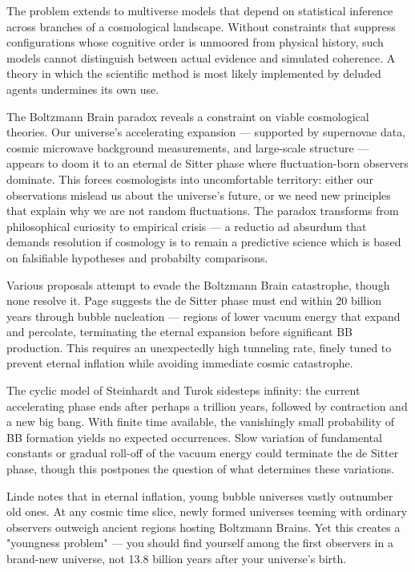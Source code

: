 The problem extends to multiverse models that depend on statistical inference across branches of a cosmological landscape. Without constraints that suppress configurations whose cognitive order is unmoored from physical history, such models cannot distinguish between actual evidence and simulated coherence. A theory in which the scientific method is most likely implemented by deluded agents undermines its own use.

The Boltzmann Brain paradox reveals a constraint on viable cosmological theories. Our universe's accelerating expansion — supported by supernovae data, cosmic microwave background measurements, and large-scale structure — appears to doom it to an eternal de Sitter phase where fluctuation-born observers dominate. This forces cosmologists into uncomfortable territory: either our observations mislead us about the universe's future, or we need new principles that explain why we are not random fluctuations. The paradox transforms from philosophical curiosity to empirical crisis — a reductio ad absurdum that demands resolution if cosmology is to remain a predictive science which is based on falsifiable hypotheses and probabilty comparisons.

Various proposals attempt to evade the Boltzmann Brain catastrophe, though none resolve it. Page suggests the de Sitter phase must end within 20 billion years through bubble nucleation — regions of lower vacuum energy that expand and percolate, terminating the eternal expansion before significant BB production. This requires an unexpectedly high tunneling rate, finely tuned to prevent eternal inflation while avoiding immediate cosmic catastrophe.

The cyclic model of Steinhardt and Turok sidesteps infinity: the current accelerating phase ends after perhaps a trillion years, followed by contraction and a new big bang. With finite time available, the vanishingly small probability of BB formation yields no expected occurrences. Slow variation of fundamental constants or gradual roll-off of the vacuum energy could terminate the de Sitter phase, though this postpones the question of what determines these variations.

Linde notes that in eternal inflation, young bubble universes vastly outnumber old ones. At any cosmic time slice, newly formed universes teeming with ordinary observers outweigh ancient regions hosting Boltzmann Brains. Yet this creates a "youngness problem" — you should find yourself among the first observers in a brand-new universe, not 13.8 billion years after your universe's birth.

